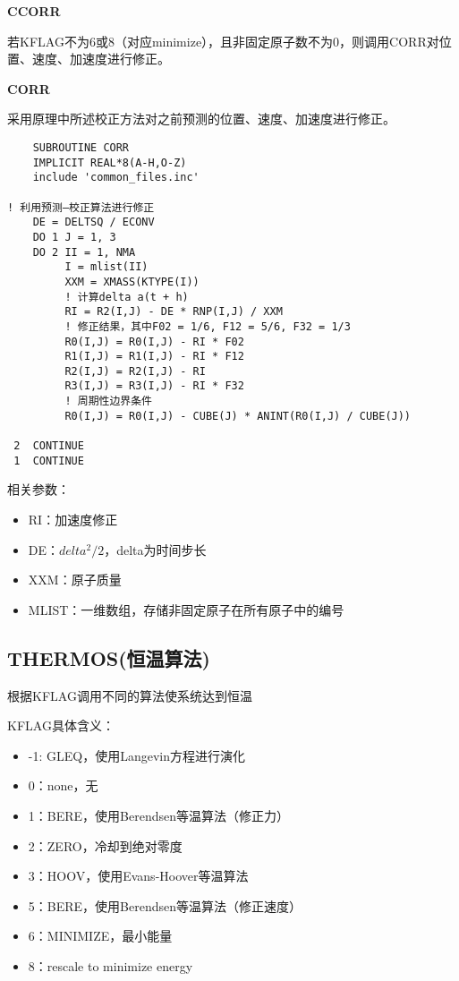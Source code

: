 \documentclass[UTF-8]{ctexart}
\begin{document}
\noindent
\textbf{CCORR}

若KFLAG不为6或8（对应minimize），且非固定原子数不为0，则调用CORR对位置、速度、加速度进行修正。

\noindent
\textbf{CORR}

采用原理中所述校正方法对之前预测的位置、速度、加速度进行修正。

\begin{verbatim}
    SUBROUTINE CORR
    IMPLICIT REAL*8(A-H,O-Z)
    include 'common_files.inc'

! 利用预测—校正算法进行修正
    DE = DELTSQ / ECONV
    DO 1 J = 1, 3
    DO 2 II = 1, NMA
         I = mlist(II)
         XXM = XMASS(KTYPE(I))
         ! 计算delta a(t + h)
         RI = R2(I,J) - DE * RNP(I,J) / XXM
         ! 修正结果，其中F02 = 1/6, F12 = 5/6, F32 = 1/3
         R0(I,J) = R0(I,J) - RI * F02
         R1(I,J) = R1(I,J) - RI * F12
         R2(I,J) = R2(I,J) - RI
         R3(I,J) = R3(I,J) - RI * F32
         ! 周期性边界条件
         R0(I,J) = R0(I,J) - CUBE(J) * ANINT(R0(I,J) / CUBE(J))

 2  CONTINUE
 1  CONTINUE
\end{verbatim}

\noindent
相关参数：
\begin{itemize}
    \item RI：加速度修正
    \item DE：$delta ^ 2 / 2$，delta为时间步长
    \item XXM：原子质量
    \item MLIST：一维数组，存储非固定原子在所有原子中的编号
\end{itemize}

\subsection{THERMOS(恒温算法)}
根据KFLAG调用不同的算法使系统达到恒温

\noindent
KFLAG具体含义：

\begin{itemize}
    \item -1: GLEQ，使用Langevin方程进行演化
    \item  0：none，无
    \item  1：BERE，使用Berendsen等温算法（修正力）
    \item  2：ZERO，冷却到绝对零度
    \item  3：HOOV，使用Evans-Hoover等温算法
    \item  5：BERE，使用Berendsen等温算法（修正速度）
    \item  6：MINIMIZE，最小能量
    \item  8：rescale to minimize energy
\end{itemize}
\end{document}
